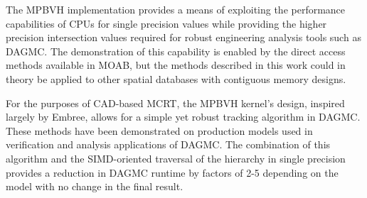 The MPBVH implementation provides a means of exploiting the performance
capabilities of CPUs for single precision values while providing the higher
precision intersection values required for robust engineering analysis tools
such as DAGMC. The demonstration of this capability is enabled by the direct
access methods available in MOAB, but the methods described in this work could
in theory be applied to other spatial databases with contiguous memory designs.

For the purposes of CAD-based MCRT, the MPBVH kernel's design, inspired largely
by Embree, allows for a simple yet robust tracking algorithm in DAGMC. These
methods have been demonstrated on production models used in verification and
analysis applications of DAGMC. The combination of this algorithm and the
SIMD-oriented traversal of the hierarchy in single precision provides a
reduction in DAGMC runtime by factors of 2-5 depending on the model with no
change in the final result.
